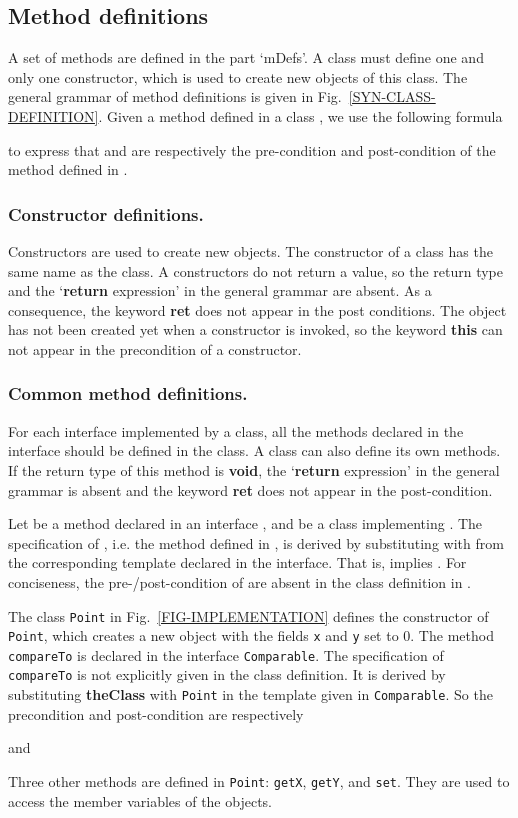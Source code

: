 \documentclass[fleqn]{llncs}
\begin{document}
\subsection{Method definitions}\label{Subsec-METHOD-DEF}
A set of methods are defined in the part `mDefs'. A class must define one and only one constructor, which is used to create new objects of this class.
The general grammar of method definitions is given in Fig.~\ref{SYN-CLASS-DEFINITION}. Given a method  defined in a class , we use the following formula
    
to express that  and  are respectively the pre-condition and post-condition of the method  defined in .

\subsubsection{Constructor definitions.}
Constructors are used to create new objects. The constructor of a class has the same name as the class.
A constructors do not return a value, so the return type and the `\textbf{return} expression' in the general grammar are absent. As a consequence, the keyword \textbf{ret} does not appear in the post conditions.
The object has not been created yet when a constructor is invoked, so the keyword \textbf{this} can not appear in the precondition of a constructor.

\subsubsection{Common method definitions.}
For each interface implemented by a class, all the methods declared in the interface should be defined in the class.
A class can also define its own methods.
If the return type of this method is \textbf{void}, the `\textbf{return} expression' in the general grammar is absent and
the keyword \textbf{ret} does not appear in the post-condition.

Let  be a method declared in an interface , and  be a class implementing .
The specification of , i.e. the method defined in , is derived by substituting  with  from the corresponding template declared in the interface.
That is,  implies .
For conciseness, the pre-/post-condition of  are absent in the class definition in .

\begin{example}
\label{EXAMPLE-METHOD-DEFINITION}
The class \texttt{Point} in Fig.~\ref{FIG-IMPLEMENTATION} defines the constructor of \texttt{Point}, which creates a new object with the fields \texttt{x} and \texttt{y} set to 0.
The method \texttt{compareTo} is declared in the interface \texttt{Comparable}. The specification of \texttt{compareTo} is not explicitly given in the class definition.
 It is derived by substituting \textbf{theClass} with \texttt{Point}
 in the template given in \texttt{Comparable}. So the precondition and post-condition are respectively

and

Three other methods are defined in \texttt{Point}: \texttt{getX}, \texttt{getY}, and \texttt{set}. They are used to access the member variables of the objects.
\hfill
\end{example}
\end{document}
